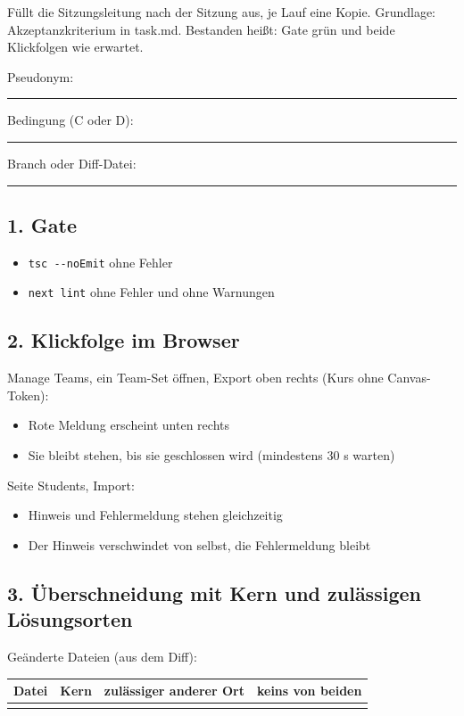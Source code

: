 Füllt die Sitzungsleitung nach der Sitzung aus, je Lauf eine Kopie. Grundlage: Akzeptanzkriterium in task.md. Bestanden heißt: Gate grün und beide Klickfolgen wie erwartet.

\noindent Pseudonym:~\rule{2.5em}{0.4pt}\par
\noindent Bedingung (C oder D):~\rule{2.5em}{0.4pt}\par
\noindent Branch oder Diff-Datei:~\rule{2.5em}{0.4pt}\par
\subsection*{1. Gate}

\begin{itemize}[nosep,leftmargin=2.4em]
\item[\kreuz] \texttt{tsc -{}-noEmit} ohne Fehler
\item[\kreuz] \texttt{next lint} ohne Fehler und ohne Warnungen
\end{itemize}
\subsection*{2. Klickfolge im Browser}

Manage Teams, ein Team-Set öffnen, Export oben rechts (Kurs ohne Canvas-Token):

\begin{itemize}[nosep,leftmargin=2.4em]
\item[\kreuz] Rote Meldung erscheint unten rechts
\item[\kreuz] Sie bleibt stehen, bis sie geschlossen wird (mindestens 30 s warten)
\end{itemize}
Seite Students, Import:

\begin{itemize}[nosep,leftmargin=2.4em]
\item[\kreuz] Hinweis und Fehlermeldung stehen gleichzeitig
\item[\kreuz] Der Hinweis verschwindet von selbst, die Fehlermeldung bleibt
\end{itemize}
\subsection*{3. Überschneidung mit Kern und zulässigen Lösungsorten}

Geänderte Dateien (aus dem Diff):

\begin{tabularx}{\linewidth}{Xlll}
\toprule
Datei & Kern & zulässiger anderer Ort & keins von beiden \\
\midrule
&&& \\
\bottomrule
\end{tabularx}


